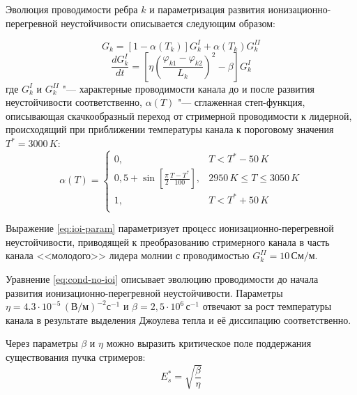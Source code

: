 Эволюция проводимости ребра $k$ и параметризация развития ионизационно-перегревной неустойчивости описывается следующим образом:

\begin{equation}
	G_k = [1-\alpha(T_k)] G_k^I + \alpha(T_k) G_k^{II}
	\label{eq:ioi-param}
\end{equation}
\begin{equation}
	\frac{dG_k^I}{dt} = \left[ \eta \left( \frac{\varphi_{k1} - \varphi_{k2}}{L_k}\right)^2 - \beta \right]G_k^I
	\label{eq:cond-no-ioi}
\end{equation}
где $G_k^I$ и $G_k^{II}$ "--- характерные проводимости канала до и после развития неустойчивости соответственно, $\alpha(T)$ "--- сглаженная степ-функция, описывающая скачкообразный переход от стримерной проводимости к лидерной, происходящий при приближении температуры канала к пороговому значения $T^* = 3000\,K$:
\begin{equation}
	\alpha(T) = \begin{cases}
		0, & T<T^*-50\,K\\
		0,5 + \sin\left[\frac{\pi}{2}\frac{T-T^*}{100}\right], & 2950\,K \le T \le 3050\,K\\
		1, & T<T^*+50\,K\\   
	\end{cases}
	\label{eq:alph-param}
\end{equation}

Выражение \eqref{eq:ioi-param} параметризует процесс ионизационно-перегревной неустойчивости, приводящей к преобразованию стримерного канала в часть канала <<молодого>> лидера молнии с проводимостью $G_k^{II} = 10\,\text{См}/\text{м}$. 

Уравнение \eqref{eq:cond-no-ioi} описывает эволюцию проводимости до начала развития ионизационно-перегревной неустойчивости. Параметры $\eta = 4.3\cdot10^{-5}\,(\text{В}/\text{м})^{-2}\text{с}^{-1}$ и $\beta = 2,5\cdot10^6\,\text{с}^{-1}$ отвечают за рост температуры канала в результате выделения Джоулева тепла и её  диссипацию соответственно.

Через параметры $\beta$ и $\eta$ можно выразить критическое поле поддержания существования пучка стримеров:
\begin{equation}
	E_{s}^* = \sqrt{\frac{\beta}{\eta}}
\end{equation}
